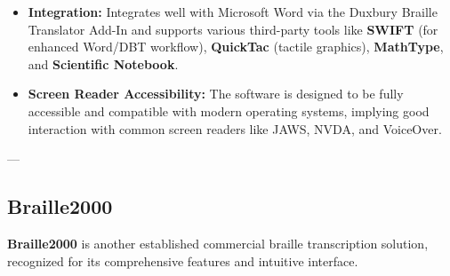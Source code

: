 \begin{itemize}
\begin{itemize}
        \item \textbf{Integration:} Integrates well with Microsoft Word via the Duxbury Braille Translator Add-In and supports various third-party tools like \textbf{SWIFT} (for enhanced Word/DBT workflow), \textbf{QuickTac} (tactile graphics), \textbf{MathType}, and \textbf{Scientific Notebook}.
        \item \textbf{Screen Reader Accessibility:} The software is designed to be fully accessible and compatible with modern operating systems, implying good interaction with common screen readers like JAWS, NVDA, and VoiceOver.
    \end{itemize}
\end{itemize}

---

\subsection{Braille2000}
\textbf{Braille2000} is another established commercial braille transcription solution, recognized for its comprehensive features and intuitive interface.

